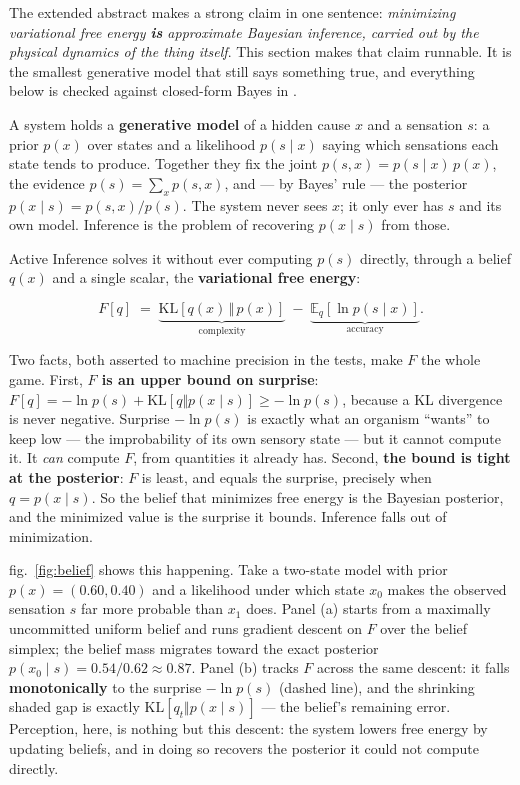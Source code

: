 \documentclass[
  english,
]{article}
\begin{document}
The extended abstract makes a strong claim in one sentence:
\emph{minimizing variational free energy \textbf{is} approximate
Bayesian inference, carried out by the physical dynamics of the thing
itself}. This section makes that claim runnable. It is the smallest
generative model that still says something true, and everything below is
checked against closed-form Bayes in .

A system holds a \textbf{generative model} of a hidden cause \(x\) and a
sensation \(s\): a prior \(p(x)\) over states and a likelihood
\(p(s \mid x)\) saying which sensations each state tends to produce.
Together they fix the joint \(p(s, x) = p(s \mid x)\,p(x)\), the
evidence \(p(s) = \sum_x p(s, x)\), and --- by Bayes' rule --- the
posterior \(p(x \mid s) = p(s, x) / p(s)\). The system never sees \(x\);
it only ever has \(s\) and its own model. Inference is the problem of
recovering \(p(x \mid s)\) from those.

Active Inference solves it without ever computing \(p(s)\) directly,
through a belief \(q(x)\) and a single scalar, the \textbf{variational
free energy}:

\[
F[q] \;=\; \underbrace{\mathrm{KL}\!\left[q(x)\,\Vert\,p(x)\right]}_{\text{complexity}}
\;-\; \underbrace{\mathbb{E}_{q}\!\left[\ln p(s \mid x)\right]}_{\text{accuracy}}.
\]

Two facts, both asserted to machine precision in the tests, make \(F\)
the whole game. First, \textbf{\(F\) is an upper bound on surprise}:
\(F[q] = -\ln p(s) +
\mathrm{KL}\!\left[q \Vert p(x \mid s)\right] \ge -\ln p(s)\), because a
KL divergence is never negative. Surprise \(-\ln p(s)\) is exactly what
an organism ``wants'' to keep low --- the improbability of its own
sensory state --- but it cannot compute it. It \emph{can} compute \(F\),
from quantities it already has. Second, \textbf{the bound is tight at
the posterior}: \(F\) is least, and equals the surprise, precisely when
\(q = p(x \mid s)\). So the belief that minimizes free energy is the
Bayesian posterior, and the minimized value is the surprise it bounds.
Inference falls out of minimization.

fig.~\ref{fig:belief} shows this happening. Take a two-state model with
prior \(p(x) = (0.60, 0.40)\) and a likelihood under which state \(x_0\)
makes the observed sensation \(s\) far more probable than \(x_1\) does.
Panel (a) starts from a maximally uncommitted uniform belief and runs
gradient descent on \(F\) over the belief simplex; the belief mass
migrates toward the exact posterior
\(p(x_0 \mid s) = 0.54/0.62 \approx 0.87\). Panel (b) tracks \(F\)
across the same descent: it falls \textbf{monotonically} to the surprise
\(-\ln p(s)\) (dashed line), and the shrinking shaded gap is exactly
\(\mathrm{KL}\!\left[q_t \Vert p(x \mid
s)\right]\) --- the belief's remaining error. Perception, here, is
nothing but this descent: the system lowers free energy by updating
beliefs, and in doing so recovers the posterior it could not compute
directly.
\end{document}

